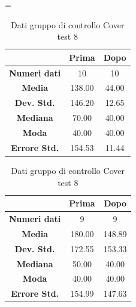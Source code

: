 \begin{table}
\centering
\setlength\tabcolsep{4pt}
\begin{minipage}{0.48\textwidth}
\centering
\tablewidth=\textwidth

\begin{tabular}{|c|c|c|} \hline
{\textbf{}} & {\textbf{  \hspace{8pt}Prima\hspace{8pt} }} & {\textbf{ \hspace{8pt}Dopo\hspace{8pt}  }}\\ \hline
\textbf{Numeri dati} & 10 & 10 \\ 
\textbf{Media} & 138.00 & 44.00 \\  
\textbf{Dev. Std.} & 146.20 & 12.65 \\  
\textbf{Mediana} & 70.00 & 40.00 \\ 
\textbf{Moda} & 40.00 & 40.00 \\ 
\textbf{Errore Std.} & 154.53 & 11.44 \\ 
\hline
\end{tabular}
\caption{Dati gruppo sperimentale Cover test 8}

\label{tab:accuracy} 
\end{minipage}%
\hfill
\begin{minipage}{0.48\textwidth}
\centering

\begin{tabular}{|c|c|c|} \hline
{\textbf{}} & {\textbf{  \hspace{8pt}Prima\hspace{8pt} }} & {\textbf{ \hspace{8pt}Dopo\hspace{8pt}  }}\\ \hline
\textbf{Numeri dati} & 9 & 9 \\ 
\textbf{Media} & 180.00 & 148.89 \\  
\textbf{Dev. Std.} & 172.55 & 153.33 \\  
\textbf{Mediana} & 50.00 & 40.00 \\  
\textbf{Moda} & 40.00 & 40.00 \\
\textbf{Errore Std.} & 154.99 & 147.63 \\
\hline
\end{tabular}
\caption{Dati gruppo di controllo Cover test 8}

 \label{tab:ompdiff} 
\end{minipage}
\end{table}
